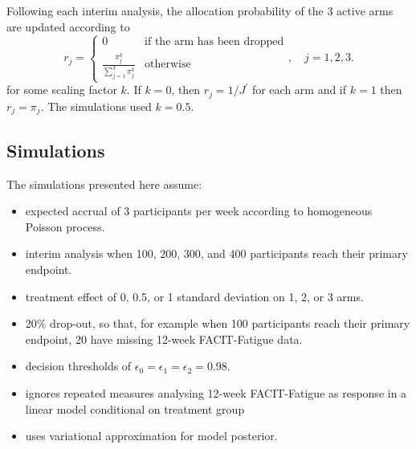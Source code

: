 \documentclass[11pt,parskip=half-]{scrartcl}
\begin{document}
Following each interim analysis, the allocation probability of the 3 active arms are updated according to
$$
  r_j = \begin{cases}
    0                                   & \text{if the arm has been dropped} \\
    \frac{\pi_j^k}{\sum_{j=1}^3\pi_j^k} & \text{otherwise}
  \end{cases},\quad j=1,2,3.
$$
for some scaling factor $k$. If $k=0$, then $r_j = 1/J^\prime$ for each arm and if $k=1$ then $r_j = \pi_j$. The simulations used $k=0.5$.

\subsection*{Simulations}

The simulations presented here assume:
\begin{itemize}
  \item expected accrual of 3 participants per week according to homogeneous Poisson process.
  \item interim analysis when 100, 200, 300, and 400 participants reach their primary endpoint.
  \item treatment effect of 0, 0.5, or 1 standard deviation on 1, 2, or 3 arms.
  \item 20\% drop-out, so that, for example when 100 participants reach their primary endpoint, 20 have missing 12-week FACIT-Fatigue data.
  \item decision thresholds of $\epsilon_0=\epsilon_1=\epsilon_2=0.98$.
  \item ignores repeated measures analysing 12-week FACIT-Fatigue as response in a linear model conditional on treatment group
  \item uses variational approximation for model posterior.
\end{itemize}





\end{document}
